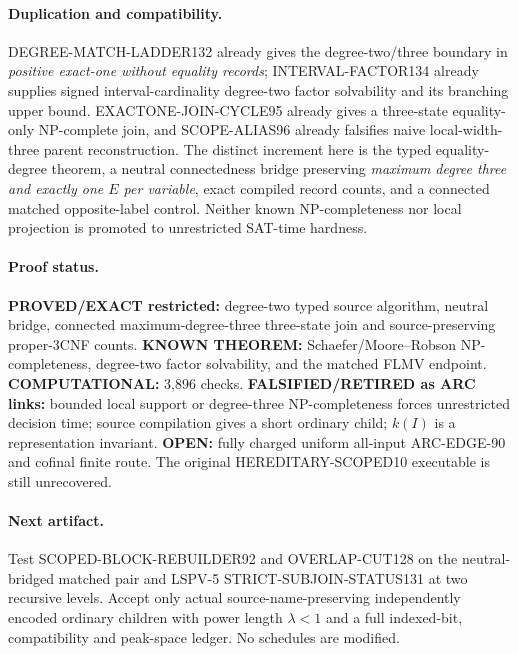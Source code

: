 \documentclass[11pt]{article}
\begin{document}
\paragraph{Duplication and compatibility.}
DEGREE-MATCH-LADDER132 already gives the degree-two/three boundary
in \emph{positive exact-one without equality records}; INTERVAL-FACTOR134
already supplies signed interval-cardinality degree-two factor solvability
and its branching upper bound. EXACTONE-JOIN-CYCLE95 already gives a
three-state equality-only NP-complete join, and SCOPE-ALIAS96 already
falsifies naive local-width-three parent reconstruction. The distinct
increment here is the typed equality-degree theorem, a neutral
connectedness bridge preserving \emph{maximum degree three and exactly
one $E$ per variable}, exact compiled record counts, and a connected
matched opposite-label control. Neither known NP-completeness nor
local projection is promoted to unrestricted SAT-time hardness.

\paragraph{Proof status.}
\textbf{PROVED/EXACT restricted:} degree-two typed source algorithm,
neutral bridge, connected maximum-degree-three three-state join and
source-preserving proper-3CNF counts. \textbf{KNOWN THEOREM:}
Schaefer/Moore--Robson NP-completeness, degree-two factor solvability,
and the matched FLMV endpoint. \textbf{COMPUTATIONAL:} 3,896 checks.
\textbf{FALSIFIED/RETIRED as ARC links:} bounded local support or
degree-three NP-completeness forces unrestricted decision time; source
compilation gives a short ordinary child; $k(I)$ is a representation
invariant. \textbf{OPEN:} fully charged uniform all-input ARC-EDGE-90
and cofinal finite route. The original HEREDITARY-SCOPED10 executable
is still unrecovered.

\paragraph{Next artifact.}
Test SCOPED-BLOCK-REBUILDER92 and OVERLAP-CUT128 on the neutral-bridged
matched pair and LSPV-5 STRICT-SUBJOIN-STATUS131 at two recursive levels.
Accept only actual source-name-preserving independently encoded ordinary
children with power length $\lambda<1$ and a full indexed-bit,
compatibility and peak-space ledger. No schedules are modified.
\end{document}
